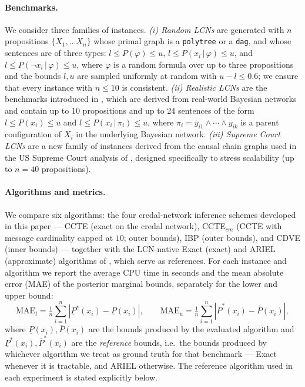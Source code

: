 \documentclass{article}
\begin{document}
\paragraph{Benchmarks.} We consider three families of instances. \emph{(i) Random LCNs} are generated with $n$ propositions $\{X_1, \ldots X_n\}$ whose primal graph is a \texttt{polytree} or a \texttt{dag}, and whose sentences are of three types: $l \leq P(\varphi) \leq u$, $l \leq P(x_i\,|\,\varphi) \leq u$, and $l \leq P(\neg x_i\,|\,\varphi) \leq u$, where $\varphi$ is a random formula over up to three propositions and the bounds $l,u$ are sampled uniformly at random with $u-l \leq 0.6$; we ensure that every instance with $n \leq 10$ is consistent. \emph{(ii) Realistic LCNs} are the benchmarks introduced in \cite{marinescu2023lcn}, which are derived from real-world Bayesian networks \cite{bn-repo} and contain up to 10 propositions and up to 24 sentences of the form $l \leq P(x_i) \leq u$ and $l \leq P(x_i\,|\,\pi_i) \leq u$, where $\pi_i = y_{i1} \wedge \cdots \wedge y_{ik}$ is a parent configuration of $X_i$ in the underlying Bayesian network. \emph{(iii) Supreme Court LCNs} are a new family of instances derived from the causal chain graphs used in the US Supreme Court analysis of \cite{ogburn2020causal}, designed specifically to stress scalability (up to $n{=}40$ propositions).

\paragraph{Algorithms and metrics.} We compare six algorithms: the four credal-network inference schemes developed in this paper --- CCTE (exact on the credal network), CCTE$_{cm}$ (CCTE with message cardinality capped at $10$; outer bounds), IBP (outer bounds), and CDVE (inner bounds) --- together with the LCN-native Exact (exact) and ARIEL (approximate) algorithms of \cite{marinescu2022neurips,marinescu2023lcn}, which serve as references. For each instance and algorithm we report the average CPU time in seconds and the mean absolute error (MAE) of the posterior marginal bounds, separately for the lower and upper bound:
\begin{equation*}
    \textrm{MAE}_l = \tfrac{1}{n}\sum_{i=1}^{n} |\underline{P}^*(x_i) - \underline{P}(x_i)|, \qquad
    \textrm{MAE}_u = \tfrac{1}{n}\sum_{i=1}^{n} |\overline{P}^*(x_i) - \overline{P}(x_i)|,
\end{equation*}
where $\underline{P}(x_i),\overline{P}(x_i)$ are the bounds produced by the evaluated algorithm and $\underline{P}^*(x_i),\overline{P}^*(x_i)$ are the \emph{reference} bounds, i.e.\ the bounds produced by whichever algorithm we treat as ground truth for that benchmark --- Exact whenever it is tractable, and ARIEL otherwise. The reference algorithm used in each experiment is stated explicitly below.
\end{document}
